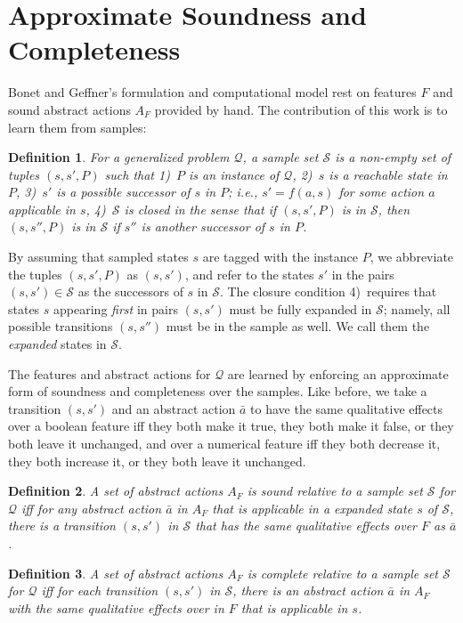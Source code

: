 \documentclass[letterpaper]{article} %
\newtheorem{definition}{Definition}
\newcommand{\Q}{\mathcal{Q}}
\renewcommand{\S}{\mathcal{S}}
\begin{document}
\section{Approximate Soundness and Completeness}

Bonet and Geffner's formulation and computational model rest on 
features $F$ and  sound abstract actions $A_F$ provided by hand.
The contribution of this work is to learn them  from samples:


\begin{definition}
  For a generalized problem $\Q$, a \emph{sample set}  $\S$ is a non-empty set of tuples  $(s,s',P)$
  such that 1)~$P$ is an instance of $\Q$, 2)~$s$ is a reachable state in $P$, 3)~$s'$
  is a possible successor of $s$ in $P$; i.e., $s'=f(a,s)$ for some action $a$ applicable in $s$,
  4)~$\S$ is closed in the sense  that if $(s,s',P)$ is in $\S$, then $(s,s'',P)$ is in $\S$  if $s''$ is another
  successor of $s$ in $P$.
\end{definition}

By assuming that sampled states $s$ are tagged with the instance $P$, 
we abbreviate the tuples $(s,s',P)$ as $(s,s')$, and refer to the
states $s'$ in  the pairs $(s,s') \in \S$ as the successors of
$s$ in $\S$. The  closure condition 4)~requires that
states $s$ appearing \emph{first} in pairs $(s,s')$ must be fully expanded in $\S$;
namely, all possible transitions $(s,s'')$ must be in the sample as well. We call them
the \emph{expanded} states in $\S$.

The features and abstract actions for $\Q$ are  learned by
enforcing an approximate form of soundness and completeness
over the samples. Like before,  we take a transition $(s,s')$ and an abstract action $\bar{a}$
to have  the same qualitative effects over a boolean  feature  iff they both make it true, they both make it false,  or
they both leave it unchanged,  and over a numerical feature  iff they both decrease it,  they both increase it,  or they both leave it unchanged.

\begin{definition}
  A set of abstract actions $A_F$ is sound \emph{relative to a  sample set} $\S$ for $\Q$
  iff for  any  abstract action $\bar{a}$ in $A_F$ that is applicable in  a expanded state $s$ of $\S$,
  there is a transition $(s,s')$ in $\S$ that has the same qualitative  effects over $F$ as $\bar{a}$.
\end{definition}

\begin{definition}
  A set of abstract actions $A_F$ is complete   \emph{relative to a sample set} $\S$ for $\Q$
  iff for each transition  $(s,s')$ in  $\S$, there is an abstract action $\bar{a}$ in $A_F$
  with the same qualitative effects over in $F$ that is applicable in $s$.
\end{definition}
\end{document}
